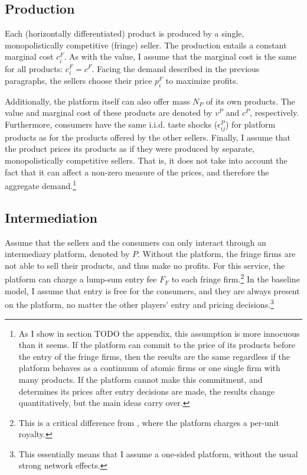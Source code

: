 \documentclass[a4paper]{article}
\begin{document}
\subsection{Production}

Each (horizontally differentiated) product is produced by a single, monopolistically competitive (fringe) seller.
The production entails a constant marginal cost $c^F_i$.
As with the value, I assume that the marginal cost is the same for all products: $c^F_i = c^F$.
Facing the demand described in the previous paragraphs, the sellers choose their price $p^F_i$ to maximize profits.

Additionally, the platform itself can also offer mass $N_P$ of its own products.
The value and marginal cost of these products are denoted by $v^P$ and $c^P$, respectively.
Furthermore, consumers have the same i.i.d. taste shocks ($\epsilon^P_{ij}$) for platform products as for the products offered by the other sellers.
Finally, I assume that the product prices its products as if they were produced by separate, monopolistically competitive sellers.
That is, it does not take into account the fact that it can affect a non-zero measure of the prices, and therefore the aggregate demand.\footnote{
    As I show in section TODO the appendix, this assumption is more innocuous than it seems.
    If the platform can commit to the price of its products before the entry of the fringe firms, then the results are the same regardless if the platform behaves as a continuum of atomic firms or one single firm with many products.
    If the platform cannot make this commitment, and determines its prices after entry decisions are made, the results change quantitatively, but the main ideas carry over.  %
}

\subsection{Intermediation}

Assume that the sellers and the consumers can only interact through an intermediary platform, denoted by $P$.
Without the platform, the fringe firms are not able to sell their products, and thus make no profits.
For this service, the platform can charge a lump-sum entry fee $F_F$ to each fringe firm.\footnote{
    This is a critical difference from \textcite[]{anderson2021hybrid}, where the platform charges a per-unit royalty.
}
In the baseline model, I assume that entry is free for the consumers, and they are always present on the platform, no matter the other players' entry and pricing decisions.\footnote{
    This essentially means that I assume a one-sided platform, without the usual strong network effects.
}
\end{document}
